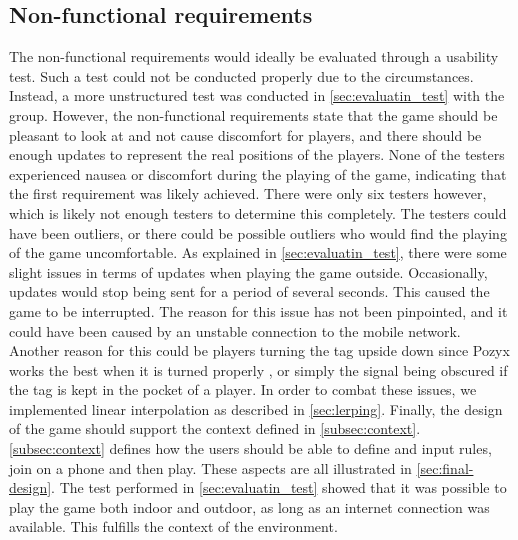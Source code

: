 \subsection{Non-functional requirements}
The non-functional requirements would ideally be evaluated through a usability test.
Such a test could not be conducted properly due to the circumstances.
Instead, a more unstructured test was conducted in \autoref{sec:evaluatin_test} with the group.
However, the non-functional requirements state that the game should be pleasant to look at and not cause discomfort for players, and there should be enough updates to represent the real positions of the players.
None of the testers experienced nausea or discomfort during the playing of the game, indicating that the first requirement was likely achieved.
There were only six testers however, which is likely not enough testers to determine this completely.
The testers could have been outliers, or there could be possible outliers who would find the playing of the game uncomfortable.
As explained in \autoref{sec:evaluatin_test}, there were some slight issues in terms of updates when playing the game outside.
Occasionally, updates would stop being sent for a period of several seconds.
This caused the game to be interrupted.
The reason for this issue has not been pinpointed, and it could have been caused by an unstable connection to the mobile network.
Another reason for this could be players turning the tag upside down since Pozyx works the best when it is turned properly \cite{pozyx-AnchorHeights}, or simply the signal being obscured if the tag is kept in the pocket of a player.
In order to combat these issues, we implemented linear interpolation as described in \autoref{sec:lerping}.
Finally, the design of the game should support the context defined in \autoref{subsec:context}.
\autoref{subsec:context} defines how the users should be able to define and input rules, join on a phone and then play.
These aspects are all illustrated in \autoref{sec:final-design}.
The test performed in \autoref{sec:evaluatin_test} showed that it was possible to play the game both indoor and outdoor, as long as an internet connection was available.
This fulfills the context of the environment.
